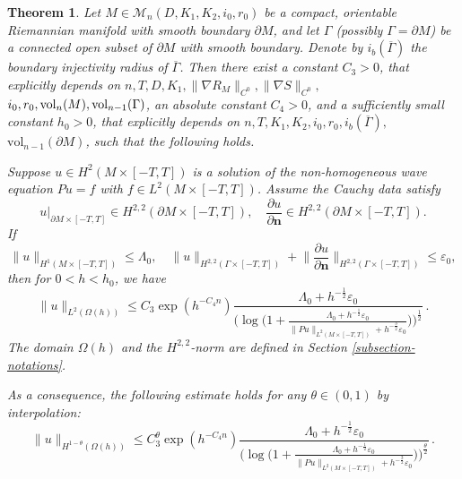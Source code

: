 \documentclass[11pt,letterpaper]{amsart}
\numberwithin{equation}{section}
\theoremstyle{definition}
\theoremstyle{plain}
\theoremstyle{definition}
\theoremstyle{plain}
\newtheorem{main1}{Theorem}[section]
\theoremstyle{definition}
\theoremstyle{plain}
\newcommand{\vol}{\textrm{vol}}
\begin{document}
\begin{main1}\label{main1}
Let $M\in \mathcal{M}_n(D,K_1,K_2,i_0,r_0)$ be a compact, orientable Riemannian manifold with smooth boundary $\partial M$, and let $\Gamma$ (possibly $\Gamma=\partial M$) be a connected open subset of $\partial M$ with smooth boundary. Denote by $i_b(\overline{\Gamma})$ the boundary injectivity radius of $\overline{\Gamma}$.
Then there exist a constant $C_3>0$, that explicitly depends on $n,T,D,K_1,\|\nabla R_M\|_{C^0},\|\nabla S\|_{C^0},$ $i_0,r_0,\hbox{vol}_n(M),\hbox{vol}_{n-1}(\Gamma)$,  an absolute constant
 $C_4>0$, 
and a 
 sufficiently small constant $h_0>0$, that explicitly depends on $n,T,K_1,K_2,i_0,r_0,i_b(\overline{\Gamma}),$ $\vol_{n-1}(\partial M)$,
 such that  the following holds. 
 

 Suppose $u\in H^2(M\times[-T,T])$ is a solution of the non-homogeneous wave equation $Pu=f$ with $f\in L^2(M\times [-T,T])$. Assume the Cauchy data satisfy
\begin{equation}\label{smoothness of C-data}
u|_{\partial M\times [-T,T]}\in H^{2,2}(\partial M \times [-T,T]),\quad \frac{\partial u}{\partial \mathbf{n}} \in H^{2,2}(\partial M \times [-T,T]).
\end{equation}
If %
\begin{equation}\label{quantitative smoothness}
\|u\|_{H^1(M\times[-T,T])}\leqslant \Lambda_0,\quad \|u\|_{H^{2,2}(\Gamma\times [-T,T])}+\big\|\frac{\partial u}{\partial \mathbf{n}}\big\|_{H^{2,2}(\Gamma\times [-T,T])}\leqslant \varepsilon_0,
\end{equation}
then for $0<h<h_0$, we have
$$\|u\|_{L^2(\Omega(h))}\leqslant C_3 \exp(h^{-C_4 n})\frac{\Lambda_0+h^{-\frac{1}{2}}\varepsilon_0}{\bigg(\log \big(1+\frac{\Lambda_0+h^{-\frac{1}{2}}\varepsilon_0}{\|Pu\|_{L^2(M\times[-T,T])}+h^{-\frac{3}{2}}\varepsilon_0}\big)\bigg) ^{\frac{1}{2}}}\, .$$
The domain $\Omega(h)$ and the $H^{2,2}$-norm are defined in Section \ref{subsection-notations}.

As a consequence, the following estimate holds for any $\theta\in (0,1)$ by interpolation:
$$\|u\|_{H^{1-\theta}(\Omega(h))}\leqslant C_3^{\theta}\exp(h^{-C_4 n})\frac{\Lambda_0+h^{-\frac{1}{2}}\varepsilon_0}{\bigg(\log \big(1+\frac{\Lambda_0+h^{-\frac{1}{2}}\varepsilon_0}{\|Pu\|_{L^2(M\times[-T,T])}+h^{-\frac{3}{2}}\varepsilon_0}\big)\bigg) ^{\frac{\theta}{2}}}\, .$$
\end{main1}
\end{document}
